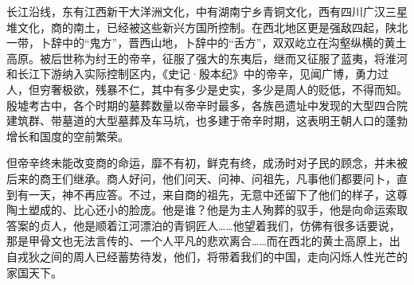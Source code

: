 长江沿线，东有江西新干大洋洲文化，中有湖南宁乡青铜文化，西有四川广汉三星堆文化，商的南土，已经被这些新兴方国所控制。在西北地区更是强敌四起，陕北一带，卜辞中的“鬼方”，晋西山地，卜辞中的“舌方”，双双屹立在沟壑纵横的黄土高原。被后世称为纣王的帝辛，征服了强大的东夷后，继而又征服了蓝夷，将淮河和长江下游纳入实际控制区内，《史记·殷本纪》中的帝辛，见闻广博，勇力过人，但穷奢极欲，残暴不仁，其中有多少是史实，多少是周人的贬低，不得而知。殷墟考古中，各个时期的墓葬数量以帝辛时最多，各族邑遗址中发现的大型四合院建筑群、带墓道的大型墓葬及车马坑，也多建于帝辛时期，这表明王朝人口的蓬勃增长和国度的空前繁荣。

但帝辛终未能改变商的命运，靡不有初，鲜克有终，成汤时对子民的顾念，并未被后来的商王们继承。商人好问，他们问天、问神、问祖先，凡事他们都要问卜，直到有一天，神不再应答。不过，来自商的祖先，无意中还留下了他们的样子，这尊陶土塑成的、比心还小的脸庞。他是谁？他是为主人殉葬的驭手，他是向命运索取答案的贞人，他是顺着江河漂泊的青铜匠人……他望着我们，仿佛有很多话要说，那是甲骨文也无法言传的、一个人平凡的悲欢离合……而在西北的黄土高原上，出自戎狄之间的周人已经蓄势待发，他们，将带着我们的中国，走向闪烁人性光芒的家国天下。
